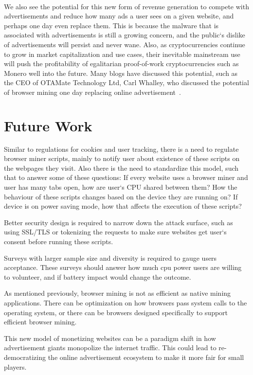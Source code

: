 \\
We also see the potential for this new form of revenue generation to compete with advertisements and reduce how many ads a user sees on a given website, and perhaps one day even replace them. This is because the malware that is associated with advertisements is still a growing concern, and the public`s dislike of advertisements will persist and never wane. Also, as cryptocurrencies continue to grow in market capitalization and use cases, their inevitable mainstream use will push the profitability of egalitarian proof-of-work cryptocurrencies such as Monero well into the future. Many blogs have discussed this potential, such as the CEO of OTAMate Technology Ltd, Carl Whalley, who discussed the potential of browser mining one day replacing online advertisement~\cite{carlcryptoads}.

\section{Future Work}

Similar to regulations for cookies and user tracking, there is a need to regulate browser miner scripts, mainly to notify user about existence of these scripts on the webpages they visit. Also there is the need to standardize this model, such that to answer some of these questions: If every website uses a browser miner and user has many tabs open, how are user`s CPU shared between them? How the behaviour of these scripts changes based on the device they are running on? If device is on power saving mode, how that affects the execution of these scripts?

Better security design is required to narrow down the attack surface, such as using SSL/TLS or tokenizing the requests to make sure websites get user`s consent before running these scripts. 

Surveys with larger sample size and diversity is required to gauge users acceptance. These surveys should answer how much cpu power users are willing to volunteer, and if battery impact would change the outcome.

As mentioned previously, browser mining is not as efficient as native mining applications. There can be optimization on how browsers pass system calls to the operating system, or there can be browsers designed specifically to support efficient browser mining.

This new model of monetizing websites can be a paradigm shift in how advertisement giants monopolize the internet traffic. This could lead to re-democratizing the online advertisement ecosystem to make it more fair for small players.
